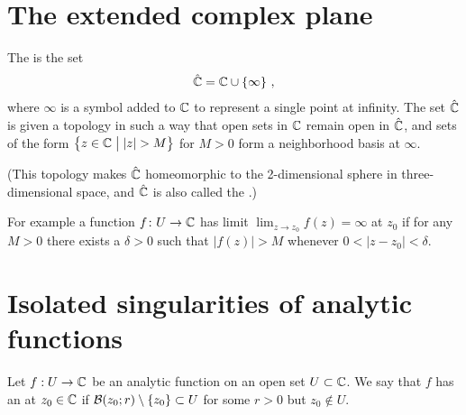 \section{The extended complex plane}

\begin{definition}
  \label{def:riemann_sphere}
  The  is the set
  \begin{align*}
    \hat{\bC} = \bC \cup \set{\infty} \, ,
  \end{align*}
  where $\infty$ is a symbol added to $\bC$ to represent a single point
  at infinity. The set $\hat{\bC}$ is given a topology
  in such a way that open sets in $\bC$ remain open in $\hat{\bC}$,
  and sets of the form $\big\{z \in \bC \; \big| \; |z|>M \big\}$ for $M>0$
  form a neighborhood basis at $\infty$.

  (This topology makes $\hat{\bC}$ homeomorphic to the 2-dimensional sphere in
  three-dimensional space, and $\hat{\bC}$ is also called the .)

  For example a function $f \colon U \to \bC$ has limit
  $\lim_{z \to z_0} f(z) = \infty$ at $z_0$ if for any $M>0$
  there exists a $\delta > 0$ such that
  $|f(z)|>M$ whenever $0 < |z-z_0| < \delta$.
\end{definition}



\section{Isolated singularities of analytic functions}

\begin{definition}
  \label{def:isolated_singularity}
  Let $f : U \to \bC$ be an analytic function on an open set $U \subset \bC$.
  We say that $f$ has an  at $z_0 \in \bC$ if
  $\BallRC{r}{z_0} \setminus \set{z_0} \subset U$ for some $r>0$ but $z_0 \notin U$.
\end{definition}

